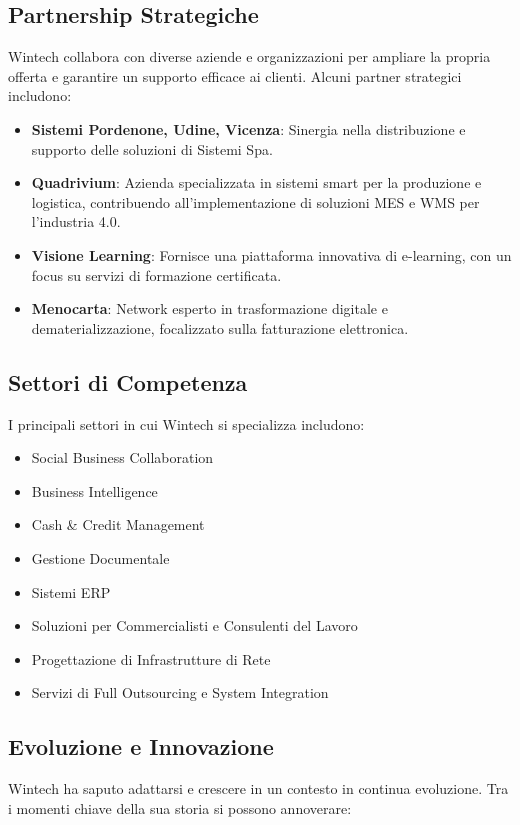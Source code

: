 \subsection{Partnership Strategiche}
Wintech collabora con diverse aziende e organizzazioni per ampliare la propria offerta e garantire un supporto efficace ai clienti. Alcuni partner strategici includono:

\begin{itemize}
    \item \textbf{Sistemi Pordenone, Udine, Vicenza}: Sinergia nella distribuzione e supporto delle soluzioni di Sistemi Spa.
    \item \textbf{Quadrivium}: Azienda specializzata in sistemi smart per la produzione e logistica, contribuendo all’implementazione di soluzioni MES e WMS per l’industria 4.0.
    \item \textbf{Visione Learning}: Fornisce una piattaforma innovativa di e-learning, con un focus su servizi di formazione certificata.
    \item \textbf{Menocarta}: Network esperto in trasformazione digitale e dematerializzazione, focalizzato sulla fatturazione elettronica.
\end{itemize}

\subsection{Settori di Competenza}
I principali settori in cui Wintech si specializza includono:

\begin{itemize}
    \item Social Business Collaboration
    \item Business Intelligence
    \item Cash \& Credit Management
    \item Gestione Documentale
    \item Sistemi ERP
    \item Soluzioni per Commercialisti e Consulenti del Lavoro
    \item Progettazione di Infrastrutture di Rete
    \item Servizi di Full Outsourcing e System Integration
\end{itemize}

\subsection{Evoluzione e Innovazione}
Wintech ha saputo adattarsi e crescere in un contesto in continua evoluzione. Tra i momenti chiave della sua storia si possono annoverare:


